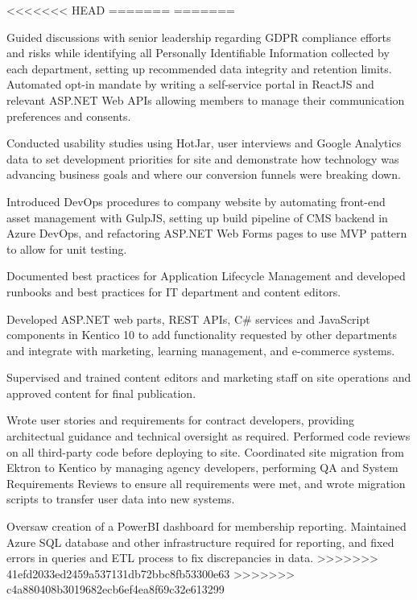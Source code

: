 \begin{cventries}
{\begin{cvitems}
<<<<<<< HEAD
=======
=======
        \item {Guided discussions with senior leadership regarding GDPR compliance efforts and risks while identifying all Personally Identifiable Information collected by each department, setting up recommended data integrity and retention limits. Automated opt-in mandate by writing a self-service portal in ReactJS and relevant ASP.NET Web APIs allowing members to manage their communication preferences and consents.}
        \item {Conducted usability studies using HotJar, user interviews and Google Analytics data to set development priorities for site and demonstrate how technology was advancing business goals and where our conversion funnels were breaking down.}
        \item {Introduced DevOps procedures to company website by automating front-end asset management with GulpJS, setting up build pipeline of CMS backend in Azure DevOps, and refactoring ASP.NET Web Forms pages to use MVP pattern to allow for unit testing.}
         \item {Documented best practices for Application Lifecycle Management and developed runbooks and best practices for IT department and content editors.}
         \item {Developed ASP.NET web parts, REST APIs, C# services and JavaScript components in Kentico 10 to add functionality requested by other departments and integrate with marketing, learning management, and e-commerce systems.}
        \item {Supervised and trained content editors and marketing staff on site operations and approved content for final publication.}
        \item {Wrote user stories and requirements for contract developers, providing architectual guidance and technical oversight as required. Performed code reviews on all third-party code before deploying to site. Coordinated site migration from Ektron to Kentico by managing agency developers, performing QA and System Requirements Reviews to ensure all requirements were met, and wrote migration scripts to transfer user data into new systems.}
        \item {Oversaw creation of a PowerBI dashboard for membership reporting. Maintained Azure SQL database and other infrastructure required for reporting, and fixed errors in queries and ETL process to fix discrepancies in data.}
>>>>>>> 41efd2033ed2459a537131db72bbc8fb53300e63
>>>>>>> c4a880408b3019682ecb6ef4ea8f69c32e613299
      \end{cvitems}
    }


\end{cventries}
